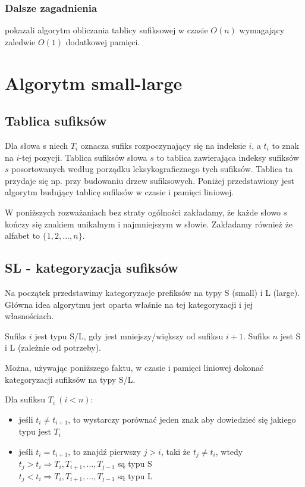 
\subsubsection{Dalsze zagadnienia}

\citet{li2018optimal} pokazali algorytm obliczania tablicy sufiksowej w czasie $O(n)$ wymagający zaledwie $O(1)$ dodatkowej pamięci.


\section{Algorytm small-large}


\subsection{Tablica sufiksów}
Dla słowa s niech $T_i$ oznacza sufiks rozpoczynający się na indeksie $i$, a $t_i$ to znak na $i$-tej pozycji. Tablica sufiksów słowa $s$ to tablica zawierająca indeksy sufiksów $s$ posortowanych według porządku leksykograficznego tych sufiksów. Tablica ta przydaje się np. przy budowaniu drzew sufiksowych. Poniżej przedstawiony jest algorytm budujący tablicę sufiksów w czasie i pamięci liniowej.

W poniższych rozważaniach bez straty ogólności zakładamy, że każde słowo $s$ kończy się znakiem unikalnym i najmniejszym w słowie. Zakładamy również że alfabet to $\{1,2,...,n\}$.

\subsection{SL - kategoryzacja sufiksów}

Na początek przedstawimy kategoryzacje prefiksów na typy S (small) i L (large). Główna idea algorytmu jest oparta właśnie na tej kategoryzacji i jej własnościach.

\begin{definition}{}{}
Sufiks $i$ jest typu S/L, gdy jest mniejszy/większy od sufiksu $i+1$. Sufiks $n$ jest S i L (zależnie od potrzeby).
\end{definition}

Można, używając poniższego faktu, w czasie i pamięci liniowej dokonać kategoryzacji sufiksów na typy S/L.

\begin{remark-thm}
Dla sufiksu $T_i \ (i<n)$:

\begin{itemize}
\item jeśli $t_i \neq t_{i+1}$, to wystarczy porównać jeden znak aby dowiedzieć się jakiego typu jest $T_i$
\item
jeśli $t_{i} = t_{i+1}$, to znajdź pierwszy $j > i$, taki że $t_j \neq t_i$, wtedy \\
$ t_j > t_i \Rightarrow T_i,T_{i+1},...,T_{j-1}$ są typu S \\
$ t_j < t_i \Rightarrow T_i,T_{i+1},...,T_{j-1}$ są typu L
\end{itemize}

\end{remark-thm}

